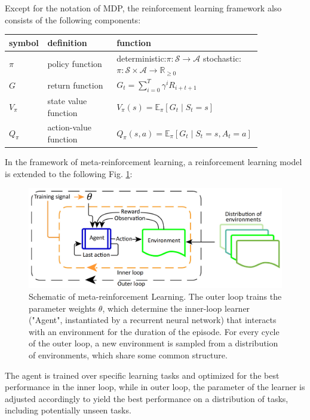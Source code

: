 \par
Except for the notation of MDP, the reinforcement learning framework also consists of the following components:

\begin{center}
	\begin{tabular}{| p{0.12\linewidth} | p{0.27\linewidth} | p{0.45\linewidth} |}
		\hline
		\textbf{symbol} & \textbf{definition} & \textbf{function} \\
		\hline
		$\pi$ & policy function & deterministic:\newline $\pi: \mathcal{S} \rightarrow \mathcal{A}$ \newline stochastic:\newline $\pi: \mathcal{S} \times \mathcal{A} \rightarrow \mathbb{R}_{\geq 0}$\\ 
		\hline
		$G$ & return function & $G_{t} = \sum_{i=0}^{T}\gamma^i R_{i+t+1}$ \\ 
		\hline 
		$V_{\pi}$ & state value function & $V_{\pi}(s)=\mathbb{E}_{\pi}\left[G_{t} \mid S_{t}=s\right]$\\
		\hline 
		$Q_{\pi}$ & action-value function & $Q_{\pi}(s, a)=\mathbb{E}_{\pi}\left[G_{t} \mid S_{t}=s, A_{t}=a\right]$ \\
		\hline 
	\end{tabular}
\end{center}

\par
In the framework of meta-reinforcement learning, a reinforcement learning model is extended to the following Fig. \ref{meta-model}:

\begin{figure}
	\includegraphics[scale=0.35]{meta-rl.png}
	\centering
	\caption{Schematic of meta-reinforcement Learning. The outer loop trains the parameter weights $\theta$, which determine the inner-loop learner ("Agent", instantiated by a recurrent neural network) that interacts with an environment for the duration of the episode. For every cycle of the outer loop, a new environment is sampled from a distribution of environments, which share some common structure.\cite{meta-model}}
	\label{meta-model}
\end{figure}

The agent is trained over specific learning tasks and optimized for the best performance in the inner loop, while in outer loop, the parameter of the learner is adjusted accordingly to yield the best performance on a distribution of tasks, including potentially unseen tasks.
